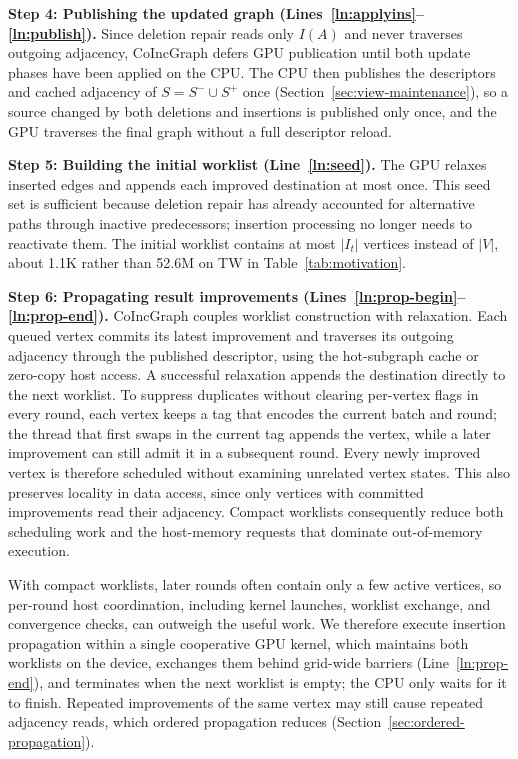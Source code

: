\textbf{Step 4: Publishing the updated graph (Lines~\ref{ln:applyins}--\ref{ln:publish}).} Since deletion repair reads only $I(A)$ and never traverses outgoing adjacency, CoIncGraph defers GPU publication until both update phases have been applied on the CPU. The CPU then publishes the descriptors and cached adjacency of $S=S^-\cup S^+$ once (Section~\ref{sec:view-maintenance}), so a source changed by both deletions and insertions is published only once, and the GPU traverses the final graph without a full descriptor reload.

\textbf{Step 5: Building the initial worklist (Line~\ref{ln:seed}).} The GPU relaxes inserted edges and appends each improved destination at most once. This seed set is sufficient because deletion repair has already accounted for alternative paths through inactive predecessors; insertion processing no longer needs to reactivate them. The initial worklist contains at most $|I_t|$ vertices instead of $|V|$, about 1.1K rather than 52.6M on TW in Table~\ref{tab:motivation}.

\textbf{Step 6: Propagating result improvements (Lines~\ref{ln:prop-begin}--\ref{ln:prop-end}).} CoIncGraph couples worklist construction with relaxation. Each queued vertex commits its latest improvement and traverses its outgoing adjacency through the published descriptor, using the hot-subgraph cache or zero-copy host access. A successful relaxation appends the destination directly to the next worklist. To suppress duplicates without clearing per-vertex flags in every round, each vertex keeps a tag that encodes the current batch and round; the thread that first swaps in the current tag appends the vertex, while a later improvement can still admit it in a subsequent round. Every newly improved vertex is therefore scheduled without examining unrelated vertex states. This also preserves locality in data access, since only vertices with committed improvements read their adjacency. Compact worklists consequently reduce both scheduling work and the host-memory requests that dominate out-of-memory execution.

With compact worklists, later rounds often contain only a few active vertices, so per-round host coordination, including kernel launches, worklist exchange, and convergence checks, can outweigh the useful work. We therefore execute insertion propagation within a single cooperative GPU kernel, which maintains both worklists on the device, exchanges them behind grid-wide barriers (Line~\ref{ln:prop-end}), and terminates when the next worklist is empty; the CPU only waits for it to finish. Repeated improvements of the same vertex may still cause repeated adjacency reads, which ordered propagation reduces (Section~\ref{sec:ordered-propagation}).

